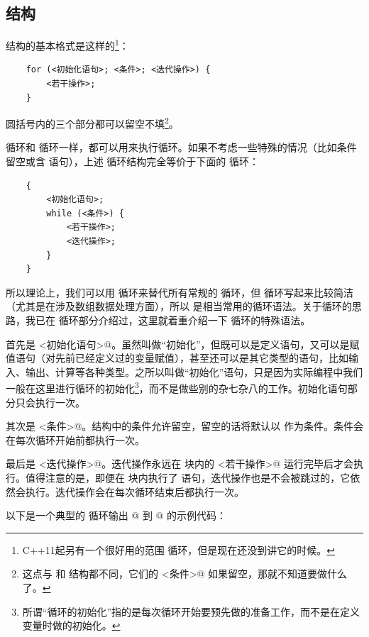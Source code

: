 \subsection*{\lstinline@for@ 结构}
\lstinline@for@ 结构的基本格式是这样的\footnote{C++11起另有一个很好用的范围 \lstinline@for@ 循环，但是现在还没到讲它的时候。}：
\begin{lstlisting}
    for (<初始化语句>; <条件>; <迭代操作>) {
        <若干操作>;
    }
\end{lstlisting}
\lstinline@for@ 圆括号内的三个部分都可以留空不填\footnote{这点与 \lstinline@if@ 和 \lstinline@while@ 结构都不同，它们的 \lstinline@<条件>@ 如果留空，那就不知道要做什么了。}。\par
\lstinline@for@ 循环和 \lstinline@while@ 循环一样，都可以用来执行循环。如果不考虑一些特殊的情况（比如条件留空或含 \lstinline@continue@ 语句），上述 \lstinline@for@ 循环结构完全等价于下面的 \lstinline@while@ 循环：
\begin{lstlisting}
    {
        <初始化语句>;
        while (<条件>) {
            <若干操作>;
            <迭代操作>;
        }
    }
\end{lstlisting}\par
所以理论上，我们可以用 \lstinline@while@ 循环来替代所有常规的 \lstinline@for@ 循环，但 \lstinline@for@ 循环写起来比较简洁（尤其是在涉及数组数据处理方面），所以 \lstinline@for@ 是相当常用的循环语法。关于循环的思路，我已在 \lstinline@while@ 循环部分介绍过，这里就着重介绍一下 \lstinline@for@ 循环的特殊语法。\par
首先是 \lstinline@<初始化语句>@。虽然叫做``初始化''，但既可以是定义语句，又可以是赋值语句（对先前已经定义过的变量赋值），甚至还可以是其它类型的语句，比如输入、输出、计算等各种类型。之所以叫做``初始化''语句，只是因为实际编程中我们一般在这里进行循环的初始化\footnote{所谓``循环的初始化''指的是每次循环开始要预先做的准备工作，而不是在定义变量时做的初始化。}，而不是做些别的杂七杂八的工作。初始化语句部分只会执行一次。\par
其次是 \lstinline@<条件>@。\lstinline@for@ 结构中的条件允许留空，留空的话将默认以 \lstinline@true@ 作为条件。条件会在每次循环开始前都执行一次。\par
最后是 \lstinline@<迭代操作>@。迭代操作永远在 \lstinline@for@ 块内的 \lstinline@<若干操作>@ 运行完毕后才会执行。值得注意的是，即便在 \lstinline@for@ 块内执行了 \lstinline@continue@ 语句，迭代操作也是不会被跳过的，它依然会执行。迭代操作会在每次循环结束后都执行一次。\par
以下是一个典型的 \lstinline@for@ 循环输出 @ 到 @ 的示例代码：
